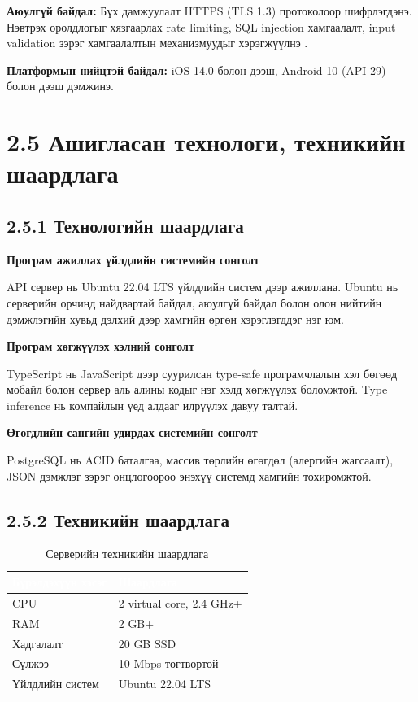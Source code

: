 \textbf{Аюулгүй байдал:} Бүх дамжуулалт HTTPS (TLS 1.3) протоколоор шифрлэгдэнэ.
Нэвтрэх оролдлогыг хязгаарлах rate limiting, SQL injection хамгаалалт, input
validation зэрэг хамгаалалтын механизмуудыг хэрэгжүүлнэ \cite{owasp2023}.

\textbf{Платформын нийцтэй байдал:} iOS 14.0 болон дээш, Android 10 (API 29) болон
дээш дэмжинэ.

\section{2.5 Ашигласан технологи, техникийн шаардлага}

\subsection{2.5.1 Технологийн шаардлага}

\textbf{Програм ажиллах үйлдлийн системийн сонголт}

API сервер нь Ubuntu 22.04 LTS үйлдлийн систем дээр ажиллана. Ubuntu нь серверийн
орчинд найдвартай байдал, аюулгүй байдал болон олон нийтийн дэмжлэгийн хувьд дэлхий
дээр хамгийн өргөн хэрэглэгддэг нэг юм.

\textbf{Програм хөгжүүлэх хэлний сонголт}

TypeScript нь JavaScript дээр суурилсан type-safe програмчлалын хэл бөгөөд мобайл
болон сервер аль алины кодыг нэг хэлд хөгжүүлэх боломжтой. Type inference нь
компайлын үед алдааг илрүүлэх давуу талтай.

\textbf{Өгөгдлийн сангийн удирдах системийн сонголт}

PostgreSQL нь ACID баталгаа, массив төрлийн өгөгдөл (алергийн жагсаалт), JSON
дэмжлэг зэрэг онцлогоороо энэхүү системд хамгийн тохиромжтой.

\subsection{2.5.2 Техникийн шаардлага}

\begin{table}[htbp]
\caption{Серверийн техникийн шаардлага}
\label{tab:hardware}
\centering
\begin{tabularx}{0.85\textwidth}{|X|X|}
\hline
\rowcolor{TableHeader}\textcolor{white}{\textbf{Бүрэлдэхүүн хэсэг}}
  & \textcolor{white}{\textbf{Шаардлага}} \\ \hline
CPU          & 2 virtual core, 2.4 GHz+     \\ \hline
RAM          & 2 GB+                         \\ \hline
Хадгалалт   & 20 GB SSD                     \\ \hline
Сүлжээ      & 10 Mbps тогтвортой            \\ \hline
Үйлдлийн систем & Ubuntu 22.04 LTS           \\ \hline
\end{tabularx}
\end{table}

